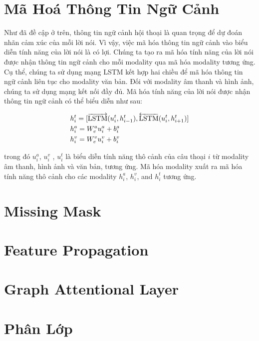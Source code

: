 \section{Mã Hoá Thông Tin Ngữ Cảnh} 

Như đã đề cập ở trên, thông tin ngữ cảnh hội thoại là quan trọng để dự đoán nhãn cảm xúc của mỗi lời nói. Vì vậy, việc mã hóa thông tin ngữ cảnh vào biểu diễn tính năng của lời nói là có lợi. Chúng ta tạo ra mã hóa tính năng của lời nói được nhận thông tin ngữ cảnh cho mỗi modality qua mã hóa modality tương ứng. Cụ thể, chúng ta sử dụng mạng LSTM kết hợp hai chiều để mã hóa thông tin ngữ cảnh liên tục cho modality văn bản. Đối với modality âm thanh và hình ảnh, chúng ta sử dụng mạng kết nối đầy đủ. Mã hóa tính năng của lời nói được nhận thông tin ngữ cảnh có thể biểu diễn như sau:

\begin{small}
\begin{equation}
\begin{aligned}
    \centering
    &h_{i}^t = [\overrightarrow{\mathrm{LSTM}}(u_{i}^t,h_{i-1}^t),\overleftarrow{\mathrm{LSTM}}(u_{i}^t,h_{i+1}^t)] \\
    &h_{i}^a = W_{e}^a u_{i}^a+b_{i}^a \\
    &h_{i}^v = W_{e}^v u_{i}^v+b_{i}^v
\end{aligned}
\end{equation}
\end{small}
trong đó $u_{i}^a$, $u_{i}^v$ , $u_{i}^t$  là biểu diễn tính năng thô cảnh của câu thoại $i$ từ modality âm thanh, hình ảnh và văn bản, tương ứng. Mã hóa modality xuất ra mã hóa tính năng thô cảnh cho các modality $h_{i}^a$, $h_{i}^v$, and $h_{i}^t$ tương ứng.




\section*{Missing Mask}

\section*{Feature Propagation}

\section{Graph Attentional Layer}

\section{Phân Lớp}

